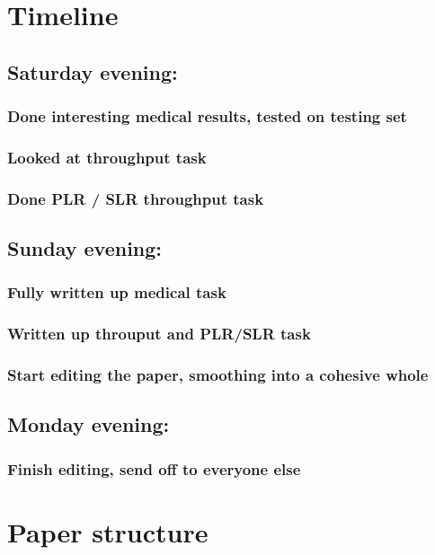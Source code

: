\documentclass[11pt]{article}
\begin{document}
\section{Timeline}
\label{sec-2}
\subsection{Saturday evening:}
\label{sec-2-1}
\subsubsection{Done interesting medical results, tested on testing set}
\label{sec-2-1-1}
\subsubsection{Looked at throughput task}
\label{sec-2-1-2}
\subsubsection{Done PLR / SLR throughput task}
\label{sec-2-1-3}
\subsection{Sunday evening:}
\label{sec-2-2}
\subsubsection{Fully written up medical task}
\label{sec-2-2-1}
\subsubsection{Written up throuput and PLR/SLR task}
\label{sec-2-2-2}
\subsubsection{Start editing the paper, smoothing into a cohesive whole}
\label{sec-2-2-3}
\subsection{Monday evening:}
\label{sec-2-3}
\subsubsection{Finish editing, send off to everyone else}
\label{sec-2-3-1}


\section{Paper structure}
\label{sec-3}
\end{document}
